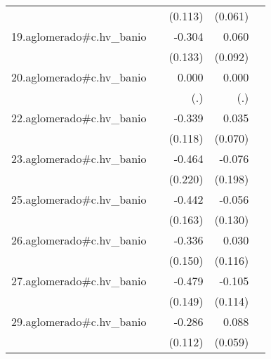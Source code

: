 {\begin{longtable}{l*{4}{D{.}{.}{-1}}}
            &                     &     (0.113)         &     (0.061)         &                     \\
\addlinespace
19.aglomerado#c.hv\_banio&                     &      -0.304\sym{*}  &       0.060         &                     \\
            &                     &     (0.133)         &     (0.092)         &                     \\
\addlinespace
20.aglomerado#c.hv\_banio&                     &       0.000         &       0.000         &                     \\
            &                     &         (.)         &         (.)         &                     \\
\addlinespace
22.aglomerado#c.hv\_banio&                     &      -0.339\sym{**} &       0.035         &                     \\
            &                     &     (0.118)         &     (0.070)         &                     \\
\addlinespace
23.aglomerado#c.hv\_banio&                     &      -0.464\sym{*}  &      -0.076         &                     \\
            &                     &     (0.220)         &     (0.198)         &                     \\
\addlinespace
25.aglomerado#c.hv\_banio&                     &      -0.442\sym{**} &      -0.056         &                     \\
            &                     &     (0.163)         &     (0.130)         &                     \\
\addlinespace
26.aglomerado#c.hv\_banio&                     &      -0.336\sym{*}  &       0.030         &                     \\
            &                     &     (0.150)         &     (0.116)         &                     \\
\addlinespace
27.aglomerado#c.hv\_banio&                     &      -0.479\sym{**} &      -0.105         &                     \\
            &                     &     (0.149)         &     (0.114)         &                     \\
\addlinespace
29.aglomerado#c.hv\_banio&                     &      -0.286\sym{*}  &       0.088         &                     \\
            &                     &     (0.112)         &     (0.059)         &                     \\

\end{longtable}}
